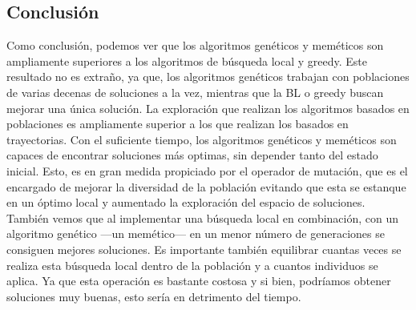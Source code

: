 \subsection{Conclusión}
Como conclusión, podemos ver que los algoritmos genéticos y meméticos son ampliamente superiores a los algoritmos de búsqueda local y greedy. Este resultado no es extraño, ya que, los algoritmos genéticos trabajan con poblaciones de varias decenas de soluciones a la vez, mientras que la BL o greedy buscan mejorar una única solución. La exploración que realizan los algoritmos basados en poblaciones es ampliamente superior a los que realizan los basados en trayectorias. Con el suficiente tiempo, los algoritmos genéticos y meméticos son capaces de encontrar soluciones más optimas, sin depender tanto del estado inicial. Esto, es en gran medida propiciado por el operador de mutación, que es el encargado de mejorar la diversidad de la población evitando que esta se estanque en un óptimo local y aumentado la exploración del espacio de soluciones.
\\
También vemos que al implementar una búsqueda local en combinación, con un algoritmo genético ---un memético--- en un menor número de generaciones se consiguen mejores soluciones. Es importante también equilibrar cuantas veces se realiza esta búsqueda local dentro de la población y a cuantos individuos se aplica. Ya que esta operación es bastante costosa y si bien, podríamos obtener soluciones muy buenas, esto sería en detrimento del tiempo.

